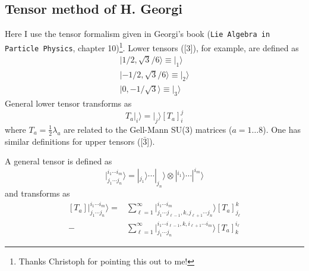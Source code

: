 \documentclass[11pt]{article}
\begin{document}
\subsection{Tensor method of H. Georgi}
Here I use the tensor formalism given in Georgi's book (\texttt{Lie Algebra in Particle Physics}, chapter 10)\footnote{Thanks Christoph for pointing this out to me!}.  Lower tensors ([3]), for example, are defined as
\begin{displaymath}
\left. \begin{array} { l } { | 1 / 2 , \sqrt { 3 } / 6 \rangle \left. \equiv \right| _ { 1 } \rangle } \\ { | - 1 / 2 , \sqrt { 3 } / 6 \rangle \left. \equiv \right| _ { 2 } \rangle } \\ { | 0 , - 1 / \sqrt { 3 } \rangle \left. \equiv \right| _ { 3 } \rangle } \end{array} \right.
\end{displaymath}
General lower tensor transforms as
\begin{displaymath}
\left. T _ { a } \right| _ { i } \rangle =\left. \right| _ { j } \rangle \left[ T _ { a } \right] _ { i } ^ { j }
\end{displaymath}
where $T_a=\frac{1}{2}\lambda_a$ are related to the Gell-Mann SU(3) matrices ($a=1\ldots 8$).
One has similar definitions for upper tensors ([$\bar{3}$]).

A general tensor is defined as
\begin{displaymath}
\left.\right| _ { j _ { 1 } \cdots j _ { n } } ^ { i _ { 1 } \cdots i _ { m } } \rangle =|_{j_1}\rangle\cdots|_{j_n}\rangle\otimes
|^{i_1}\rangle\cdots|^{i_m}\rangle
\end{displaymath}
and transforms as
\begin{align*}
\left[ T _ { a } \right]\left.\right| _ { j _ { 1 } \cdots j _ { n } } ^ { i _ { 1 } \cdots i _ { m } } \rangle =& \sum _ { \ell = 1 } ^ { \infty }\left.\right| _ { j _ { 1 } \cdots j_{\ell-1}, k,  j_{\ell+1}\cdots j _ { n } } ^ { i _ { 1 } \cdots i _ { m } } \rangle 
\left[ T _ { a } \right] _ { j _ { \ell } } ^ { k } \\
-&\sum _ { \ell = 1 } ^ { \infty }\left.\right| _ { j _ { 1 } \cdots j _ { n } } ^ { i _ { 1 } \cdots i_{\ell-1}, k,  i_{\ell+1}\cdots i _ { m } } \rangle 
\left[ T _ { a } \right] _ { k } ^ { i_\ell }
\end{align*}
\end{document}
